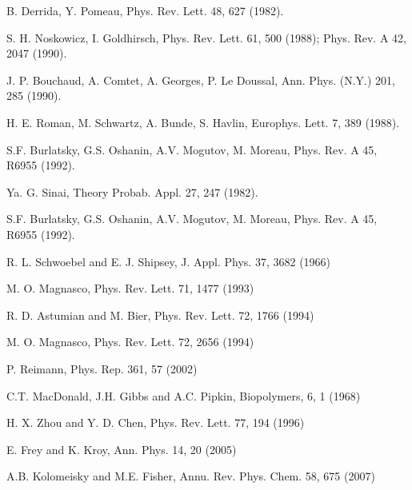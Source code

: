 \documentclass[aps,prl,floats,floatfix,twocolumn]{revtex4}
\begin{document}
\begin{thebibliography}{99}

B. Derrida, Y. Pomeau, 
Phys. Rev. Lett. 48, 627 (1982).

S. H. Noskowicz, I. Goldhirsch,
Phys. Rev. Lett. 61, 500 (1988); 
Phys. Rev. A 42, 2047 (1990). 

J. P. Bouchaud, A. Comtet, A. Georges, P. Le Doussal,
Ann. Phys. (N.Y.) 201, 285 (1990).

H. E. Roman, M. Schwartz, A. Bunde, S. Havlin, 
Europhys. Lett. 7, 389 (1988). 

S.F. Burlatsky, G.S. Oshanin, A.V. Mogutov, M. Moreau,   
Phys. Rev. A 45, R6955 (1992). 

Ya. G. Sinai, 
Theory Probab. Appl. 27, 247 (1982).

S.F. Burlatsky, G.S. Oshanin, A.V. Mogutov, M. Moreau,   
Phys. Rev. A 45, R6955 (1992). 




R. L. Schwoebel and E. J. Shipsey, J. Appl. Phys. 37, 3682 (1966) 

M. O. Magnasco, Phys. Rev. Lett. 71, 1477 (1993) 

R. D. Astumian and M. Bier, Phys. Rev. Lett. 72, 1766 (1994)

M. O. Magnasco, Phys. Rev. Lett. 72, 2656 (1994)

P. Reimann, Phys. Rep. 361, 57 (2002)

C.T. MacDonald, J.H. Gibbs and A.C. Pipkin, Biopolymers, 6, 1 (1968)

H. X. Zhou and Y. D. Chen, Phys. Rev. Lett. 77, 194 (1996) 

E. Frey and K. Kroy, Ann. Phys. 14, 20 (2005)

A.B. Kolomeisky and M.E. Fisher, Annu. Rev. Phys. Chem. 58, 675 (2007)


\end{thebibliography}
\end{document}
